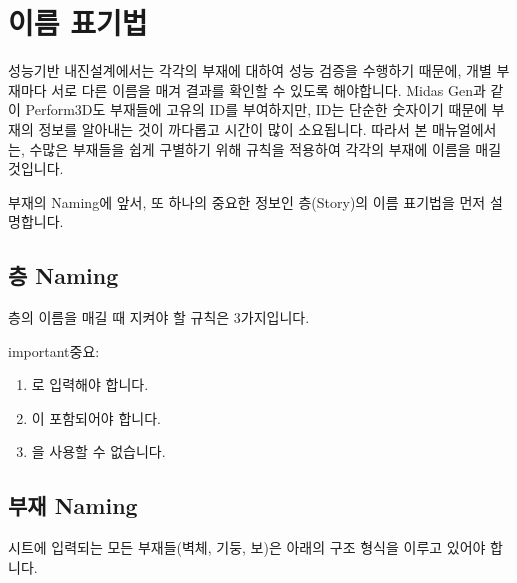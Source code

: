 \documentclass[a4paper,11pt,korean,openany,oneside]{sphinxmanual}
\begin{document}
\sphinxstepscope


\section{이름 표기법}
\label{\detokenize{2_naming_rules:id1}}\label{\detokenize{2_naming_rules::doc}}
\sphinxAtStartPar
성능기반 내진설계에서는 각각의 부재에 대하여 성능 검증을 수행하기 때문에, 개별 부재마다 서로 다른 이름을 매겨 결과를 확인할 수 있도록 해야합니다.
Midas Gen과 같이 Perform\sphinxhyphen{}3D도 부재들에 고유의 ID를 부여하지만, ID는 단순한 숫자이기 때문에 부재의 정보를 알아내는 것이 까다롭고 시간이 많이 소요됩니다.
따라서 본 매뉴얼에서는, 수많은 부재들을 쉽게 구별하기 위해 규칙을 적용하여 각각의 부재에 이름을 매길 것입니다.

\sphinxAtStartPar
부재의 Naming에 앞서, 또 하나의 중요한 정보인 층(Story)의 이름 표기법을 먼저 설명합니다.


\subsection{층 Naming}
\label{\detokenize{2_naming_rules:naming}}
\sphinxAtStartPar
층의 이름을 매길 때 지켜야 할 규칙은 3가지입니다.

\begin{sphinxadmonition}{important}{중요:}\begin{enumerate}
%
\item {} 
\sphinxAtStartPar
{}로 입력해야 합니다.

\item {} 
\sphinxAtStartPar
{}이 포함되어야 합니다.

\item {} 
\sphinxAtStartPar
{}을 사용할 수 없습니다.

\end{enumerate}
\end{sphinxadmonition}

\begin{figure}[htbp]
\centering
\capstart

\noindent{}
\caption{}\label{\detokenize{2_naming_rules:id3}}\end{figure}


\subsection{부재 Naming}
\label{\detokenize{2_naming_rules:id2}}
\sphinxAtStartPar
시트에 입력되는 모든 부재들(벽체, 기둥, 보)은 아래의 구조 형식을 이루고 있어야 합니다.
\end{document}
